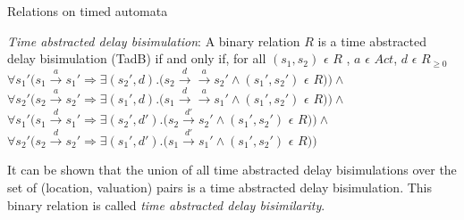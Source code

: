 \documentclass{beamer}
\begin{document}
\begin{frame}{Relations on timed automata}
\begin{definition} \label{def:tadb} \emph{Time abstracted delay bisimulation}: A binary relation
  $R$ is a time abstracted delay bisimulation (TadB) if and only if, for all
  $(s_1, s_2)$ $\epsilon$ $R$ , $a$ $\epsilon$ $Act $, $d$ $\epsilon$ $R_{\ge 0}$\\
  $\forall s_1' (s_1 \xrightarrow{a} s_1' \Rightarrow \exists (s_2', d)
  . (s_2 \xrightarrow{d} \xrightarrow{a} s_2' \wedge (s_1', s_2')$ $\epsilon$ $R ) )
  \wedge $ \\
  $\forall s_2' (s_2 \xrightarrow{a} s_2' \Rightarrow \exists (s_1', d)
  . (s_1 \xrightarrow{d} \xrightarrow{a} s_1' \wedge (s_1', s_2')$
  $\epsilon$ $R ) ) 
  \wedge $ \\
  $\forall s_1' (s_1 \xrightarrow{d} s_1' \Rightarrow \exists (s_2',
  d')
  . (s_2 \xrightarrow{d'} s_2' \wedge (s_1', s_2')$ $\epsilon$ $R ) )
  \wedge $ \\
  $\forall s_2' (s_2 \xrightarrow{d} s_2' \Rightarrow \exists (s_1', d')
  . (s_1 \xrightarrow{d'} s_1' \wedge (s_1', s_2')$ $\epsilon$ $R ) ) $ \\
\end{definition}

It can be shown that the
  union of all time abstracted delay bisimulations over the set of
  (location, valuation) pairs is a time abstracted delay
  bisimulation. This binary relation is called \textit{time abstracted
    delay bisimilarity}.
\end{frame}
\end{document}
